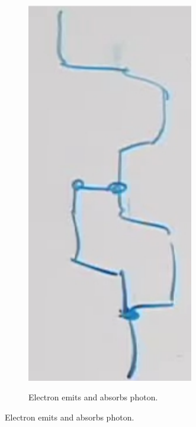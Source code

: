 \documentclass[]{article}
\begin{document}
\begin{figure}[H]
\begin{subfigure}{0.4\textwidth}
		\includegraphics[width=0.8\textwidth]{path-integral-cubic-split}
	\end{subfigure}
	\begin{subfigure}[t]{0.4\textwidth}
		\begin{center}
			\caption{Electron emits and absorbs photon.}\label{fig:path:integral:cubic:split1}
\end{center}
\end{subfigure}
\end{figure}
\end{document}
